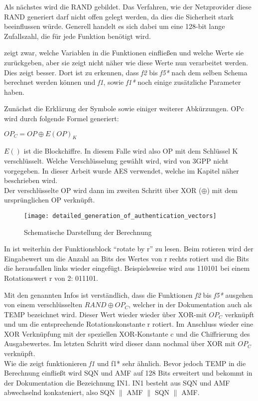  Als nächstes wird die \ac{RAND} gebildet. Das Verfahren, wie der Netzprovider diese RAND
 generiert darf nicht offen gelegt werden, da dies die Sicherheit stark beeinflussen würde.
 Generell handelt es sich dabei um eine 128-bit lange Zufallszahl, die für jede Funktion benötigt wird.
 
  zeigt zwar, welche Variablen in die Funktionen einfließen und
 welche Werte sie zurückgeben, aber sie zeigt nicht näher wie diese Werte nun verarbeitet
 werden. Dies zeigt  besser. Dort ist zu erkennen, dass
 \emph{f2} bis \emph{f5*} nach dem selben Schema berechnet werden können und \emph{f1},
 sowie \emph{f1*} noch einige zusätzliche Parameter haben.
 
 Zunächst die Erklärung der Symbole sowie einiger weiterer Abkürzungen. \ac{OPc} wird durch
 folgende Formel generiert:
 \begin{center}
  $OP_{C} = OP \oplus E(OP)_{K}$
 \end{center}
 
 $E()$ ist die Blockchiffre. In diesem Falle wird also \ac{OP} mit dem Schlüssel \ac{K}
 verschlüsselt. Welche Verschlüsselung gewählt wird, wird von 3GPP nicht vorgegeben. In
 dieser Arbeit wurde \ac{AES} verwendet, welche im Kapitel  näher beschrieben wird. \\
 Der verschlüsselte OP wird dann im zweiten Schritt über XOR ($\oplus$) mit dem ursprünglichen
 OP verknüpft.
 
 \begin{figure}[ht]
  \begin{center}
   \texttt{[image: detailed\_generation\_of\_authentication\_vectors]}
  \end{center}
  \caption[Schematische Darstellung der Berechnung der Authentifizierungsvektoren]{Schematische Darstellung der Berechnung \cite{3gpp.33.102}}
  \label{fig:schematisch_milenage}
 \end{figure}
 
 In  ist weiterhin der Funktionsblock ``rotate by r'' zu lesen.
 Beim rotieren wird der Eingabewert um die Anzahl an Bits des Wertes von r rechts rotiert und
 die Bits die herausfallen links wieder eingefügt. Beispielsweise wird aus 110101 bei einem
 Rotationswert r von 2: 011101.
 
 Mit den genannten Infos ist verständlich, dass die Funktionen \emph{f2} bis \emph{f5*}
 ausgehen von einem verschlüsselten $RAND \oplus OP_{C}$, welcher in der Dokumentation
 auch als TEMP bezeichnet wird. Dieser Wert wieder wieder über XOR-mit $OP_ {C}$ verknüpft
 und um die entsprechende Rotationskonstante r rotiert. Im Anschluss wieder eine XOR
 Verknüpfung mit der speziellen XOR-Konstante c und die Chiffrierung des Ausgabewertes. Im
 letzten Schritt wird dieser dann nochmal über XOR mit $OP_{C}$ verknüpft. \\
 Wie die  zeigt funktionieren \emph{f1} und {f1*} sehr
 ähnlich. Bevor jedoch TEMP in die Berechnung einfließt wird SQN und AMF auf 128 Bits
 erweitert und bekommt in der Dokumentation die Bezeichnung IN1. IN1 besteht aus SQN und
 AMF abwechselnd konkateniert, also SQN $\|$ AMF $\|$ SQN $\|$ AMF. \cite{3gpp.33.102}
 
